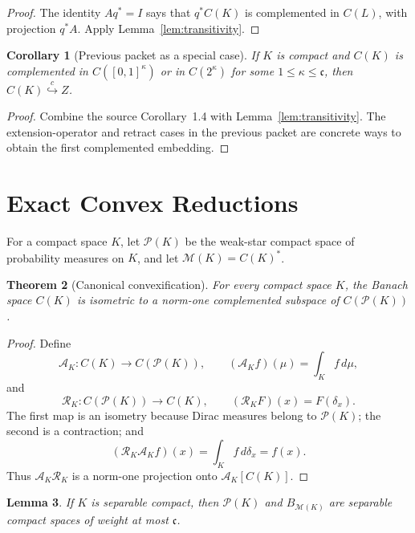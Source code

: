 \documentclass[11pt]{article}
\newtheorem{theorem}{Theorem}[section]
\newtheorem{lemma}[theorem]{Lemma}
\newtheorem{corollary}[theorem]{Corollary}
\theoremstyle{definition}
\theoremstyle{remark}
\newcommand{\C}{C}
\newcommand{\cc}{\mathfrak c}
\newcommand{\Pp}{\mathcal P}
\newcommand{\M}{\mathcal M}
\newcommand{\Id}{I}
\newcommand{\hookc}{\stackrel{c}{\hookrightarrow}}
\begin{document}
\begin{proof}
The identity \(Aq^*=\Id\) says that \(q^*\C(K)\) is complemented in
\(\C(L)\), with projection \(q^*A\).  Apply Lemma~\ref{lem:transitivity}.
\end{proof}

\begin{corollary}[Previous packet as a special case]\label{cor:old}
If \(K\) is compact and \(\C(K)\) is complemented in
\(\C([0,1]^\kappa)\) or in \(\C(2^\kappa)\) for some
\(1\leq\kappa\leq\cc\), then \(\C(K)\hookc Z\).
\end{corollary}

\begin{proof}
Combine the source Corollary~1.4 with Lemma~\ref{lem:transitivity}.  The
extension-operator and retract cases in the previous packet are concrete
ways to obtain the first complemented embedding.
\end{proof}

\section{Exact Convex Reductions}

For a compact space \(K\), let \(\Pp(K)\) be the weak-star compact space of
probability measures on \(K\), and let \(\M(K)=\C(K)^*\).

\begin{theorem}[Canonical convexification]\label{thm:convexification}
For every compact space \(K\), the Banach space \(\C(K)\) is isometric to a
norm-one complemented subspace of \(\C(\Pp(K))\).
\end{theorem}

\begin{proof}
Define
\[
 \mathcal A_K:\C(K)\to\C(\Pp(K)),\qquad
 (\mathcal A_Kf)(\mu)=\int_K f\,d\mu,
\]
and
\[
 \mathcal R_K:\C(\Pp(K))\to\C(K),\qquad
 (\mathcal R_KF)(x)=F(\delta_x).
\]
The first map is an isometry because Dirac measures belong to \(\Pp(K)\);
the second is a contraction; and
\[
(\mathcal R_K\mathcal A_Kf)(x)=\int_K f\,d\delta_x=f(x).
\]
Thus \(\mathcal A_K\mathcal R_K\) is a norm-one projection onto
\(\mathcal A_K[\C(K)]\).
\end{proof}

\begin{lemma}\label{lem:separable-convex}
If \(K\) is separable compact, then \(\Pp(K)\) and \(B_{\M(K)}\) are
separable compact spaces of weight at most \(\cc\).
\end{lemma}
\end{document}

